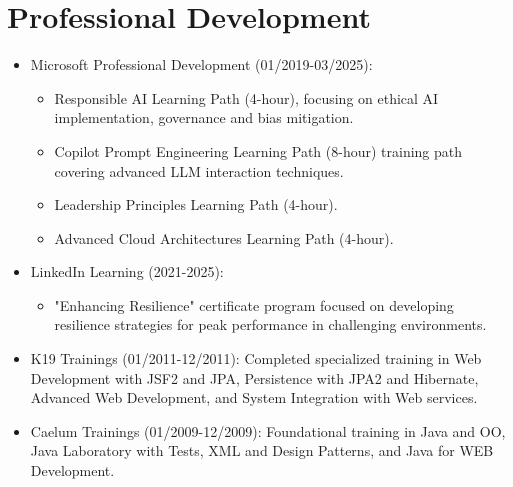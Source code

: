 
\section{Professional Development}
\begin{itemize}
    \item \footnotesize{Microsoft Professional Development (01/2019-03/2025):}
    \begin{itemize}
        \item \scriptsize{Responsible AI Learning Path (4-hour), focusing on ethical AI implementation, governance and bias mitigation.}
        \item \scriptsize{Copilot Prompt Engineering Learning Path (8-hour) training path covering advanced LLM interaction techniques.}
        \item \scriptsize{Leadership Principles Learning Path (4-hour).}
        \item \scriptsize{Advanced Cloud Architectures Learning Path (4-hour).}
    \end{itemize}
    \item \footnotesize{LinkedIn Learning (2021-2025):}
    \begin{itemize}
        \item \scriptsize{"Enhancing Resilience"  certificate program focused on developing resilience strategies for peak performance in challenging environments.}
    \end{itemize}
    \item \footnotesize{K19 Trainings (01/2011-12/2011):}\scriptsize{ Completed specialized training in Web Development with JSF2 and JPA, Persistence with JPA2 and Hibernate, Advanced Web Development, and System Integration with Web services.}
    \item \footnotesize{Caelum Trainings (01/2009-12/2009):}\scriptsize{ Foundational training in Java and OO, Java Laboratory with Tests, XML and Design Patterns, and Java for WEB Development.}
\end{itemize}